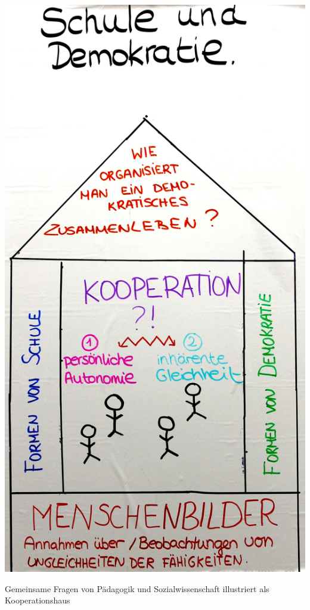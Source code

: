 \begin{dsafigure}
	\begin{center}
	\includegraphics[width=0.9\columnwidth]{img/Kooperationshaus.JPG}
	\caption{Gemeinsame Fragen von Pädagogik und Sozialwissenschaft illustriert als Kooperationshaus}
	\label{fig:kooperationshaus}
	\end{center}
\end{dsafigure}

